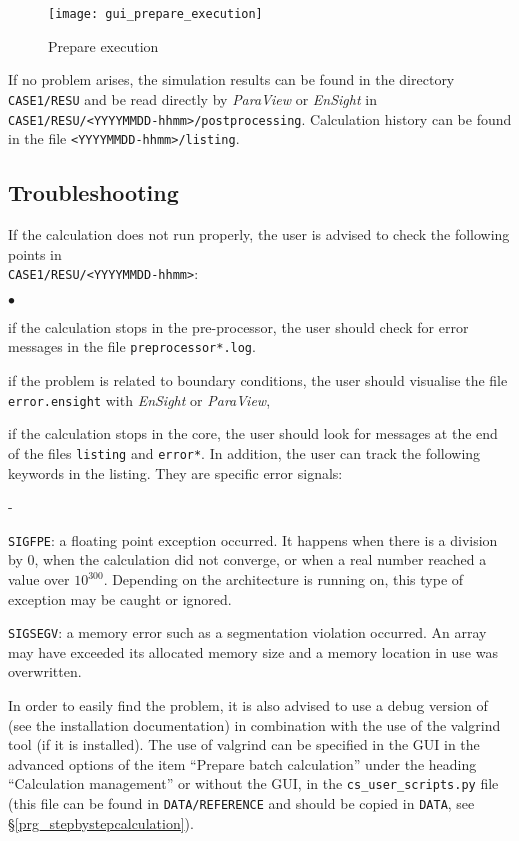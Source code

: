 \begin{figure}[!ht]
\begin{center}
\texttt{[image: gui\_prepare\_execution]}
\caption{Prepare execution}
\label{fig43_e1}
\end{center}
\end{figure}

If no problem arises, the simulation results can be found in the directory \texttt{CASE1/RESU} and be read directly by {\em ParaView} or {\em EnSight} in \texttt{CASE1/RESU/<YYYYMMDD-hhmm>/postprocessing}. Calculation history can be found in the file \texttt{<YYYYMMDD-hhmm>/listing}.

\subsection{Troubleshooting}
If the calculation does not run properly, the user is advised to check the
following points in\\
\texttt{CASE1/RESU/<YYYYMMDD-hhmm>}:
\begin{list}{$\bullet$}{}
\item  if the calculation stops in the pre-processor, the user should check for error messages in the file \texttt{preprocessor*.log}.
\item if the problem is related to boundary conditions, the user should visualise the file \texttt{error.ensight} with {\em EnSight} or {\em ParaView},
\item if the calculation stops in the \CS core, the user should look for messages at the end of the files \texttt{listing} and \texttt{error*}. In addition, the user can track the following keywords in the listing. They are specific error signals:
  \begin{list}{-}{}
  \item  \texttt{SIGFPE}: a floating point exception occurred. It happens when there is a division by 0, when the calculation did not converge, or when a real number reached a value over $10^{300}$. Depending on the architecture \CS is running
on, this type of exception may be caught or ignored.
  \item  \texttt{SIGSEGV}: a memory error such as a segmentation violation occurred. An array may have exceeded its allocated memory size and a memory location in use was overwritten.
  \end{list}
In order to easily find the problem, it is also advised to use a debug version of \CS (see the installation documentation) in combination with the use of the valgrind tool (if it is installed). The use of valgrind can be specified in the GUI in the advanced options of the item ``Prepare batch calculation'' under the heading ``Calculation management'' or without the GUI, in the \texttt{cs\_user\_scripts.py} file (this file can be found in \texttt{DATA/REFERENCE} and should be copied in \texttt{DATA}, see \S\ref{prg_stepbystepcalculation}).
\end{list}
